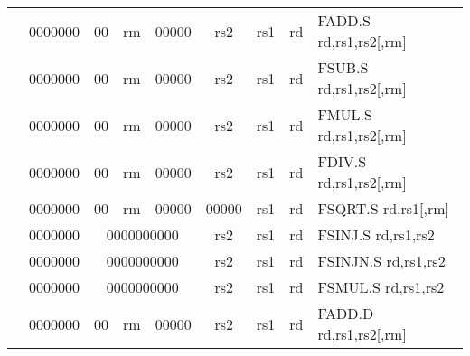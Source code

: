 \begin{table}[p]
\begin{small}
\begin{center}
\begin{tabular}{rcccccccccl}
&
\multicolumn{1}{|c|}{0000000} &
\multicolumn{1}{c|}{00} &
\multicolumn{2}{c|}{rm} &
\multicolumn{2}{c|}{00000} &
\multicolumn{1}{c|}{rs2} &
\multicolumn{1}{c|}{rs1} &
\multicolumn{1}{c|}{rd} & FADD.S rd,rs1,rs2[,rm] \\
\cline{2-10}
  

&
\multicolumn{1}{|c|}{0000000} &
\multicolumn{1}{c|}{00} &
\multicolumn{2}{c|}{rm} &
\multicolumn{2}{c|}{00000} &
\multicolumn{1}{c|}{rs2} &
\multicolumn{1}{c|}{rs1} &
\multicolumn{1}{c|}{rd} & FSUB.S rd,rs1,rs2[,rm] \\
\cline{2-10}
  

&
\multicolumn{1}{|c|}{0000000} &
\multicolumn{1}{c|}{00} &
\multicolumn{2}{c|}{rm} &
\multicolumn{2}{c|}{00000} &
\multicolumn{1}{c|}{rs2} &
\multicolumn{1}{c|}{rs1} &
\multicolumn{1}{c|}{rd} & FMUL.S rd,rs1,rs2[,rm] \\
\cline{2-10}
  

&
\multicolumn{1}{|c|}{0000000} &
\multicolumn{1}{c|}{00} &
\multicolumn{2}{c|}{rm} &
\multicolumn{2}{c|}{00000} &
\multicolumn{1}{c|}{rs2} &
\multicolumn{1}{c|}{rs1} &
\multicolumn{1}{c|}{rd} & FDIV.S rd,rs1,rs2[,rm] \\
\cline{2-10}
  

&
\multicolumn{1}{|c|}{0000000} &
\multicolumn{1}{c|}{00} &
\multicolumn{2}{c|}{rm} &
\multicolumn{2}{c|}{00000} &
\multicolumn{1}{c|}{00000} &
\multicolumn{1}{c|}{rs1} &
\multicolumn{1}{c|}{rd} & FSQRT.S rd,rs1[,rm] \\
\cline{2-10}
  

&
\multicolumn{1}{|c|}{0000000} &
\multicolumn{5}{c|}{0000000000} &
\multicolumn{1}{c|}{rs2} &
\multicolumn{1}{c|}{rs1} &
\multicolumn{1}{c|}{rd} & FSINJ.S rd,rs1,rs2 \\
\cline{2-10}
  

&
\multicolumn{1}{|c|}{0000000} &
\multicolumn{5}{c|}{0000000000} &
\multicolumn{1}{c|}{rs2} &
\multicolumn{1}{c|}{rs1} &
\multicolumn{1}{c|}{rd} & FSINJN.S rd,rs1,rs2 \\
\cline{2-10}
  

&
\multicolumn{1}{|c|}{0000000} &
\multicolumn{5}{c|}{0000000000} &
\multicolumn{1}{c|}{rs2} &
\multicolumn{1}{c|}{rs1} &
\multicolumn{1}{c|}{rd} & FSMUL.S rd,rs1,rs2 \\
\cline{2-10}
  

&
\multicolumn{1}{|c|}{0000000} &
\multicolumn{1}{c|}{00} &
\multicolumn{2}{c|}{rm} &
\multicolumn{2}{c|}{00000} &
\multicolumn{1}{c|}{rs2} &
\multicolumn{1}{c|}{rs1} &
\multicolumn{1}{c|}{rd} & FADD.D rd,rs1,rs2[,rm] \\
\cline{2-10}
  


\end{tabular}
\end{center}
\end{small}
\end{table}
